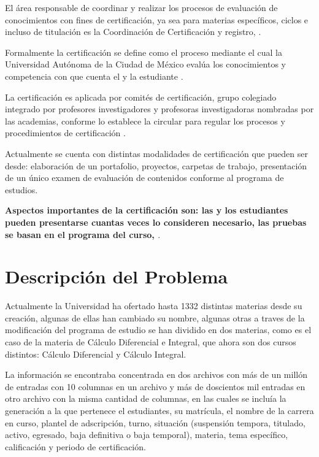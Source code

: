 \documentclass[12pt]{article}
\begin{document}
El \'area responsable de coordinar y realizar los procesos de evaluaci\'on de conocimientos con fines de certificaci\'on, ya sea para materias espec\'ificos, ciclos e incluso de titulaci\'on es la Coordinaci\'on de Certificaci\'on y registro, \cite{ProyectoEducativo}.

Formalmente la certificaci\'on se define como el proceso mediante el cual la Universidad Aut\'onoma de la Ciudad de M\'exico eval\'ua los conocimientos y competencia con que cuenta el y la estudiante \cite{CircularCertificacion}.

La certificaci\'on es aplicada por comit\'es de certificaci\'on, grupo colegiado integrado por profesores investigadores y profesoras investigadoras  nombradas por las academias,  conforme lo establece la circular para regular los procesos y procedimientos de certificaci\'on \cite{CircularCertificacion}.


Actualmente se cuenta con distintas modalidades de certificaci\'on que pueden ser desde: elaboraci\'on de un portafolio,  proyectos, carpetas de trabajo,  presentaci\'on de un \'unico examen de evaluaci\'on de contenidos conforme al programa de estudios.

\textbf{Aspectos importantes de la certificaci\'on son: las y los estudiantes pueden presentarse cuantas veces lo consideren necesario, las pruebas se basan en el programa del curso, \cite{Doc3}}.



\section{Descripci\'on del Problema}

Actualmente la Universidad ha ofertado hasta 1332 distintas materias desde su creaci\'on, algunas de ellas han cambiado su nombre, algunas otras a traves de la modificaci\'on del programa de estudio se han dividido en dos materias, como es el caso de la materia de C\'alculo Diferencial e Integral, que ahora son dos cursos distintos: C\'alculo Diferencial y C\'alculo Integral.

La informaci\'on se encontraba concentrada en dos archivos con m\'as de un mill\'on de entradas con 10 columnas en un archivo y m\'as de doscientos mil entradas en otro archivo con la misma cantidad de columnas, en las cuales se inclu\'ia la generaci\'on a la que pertenece el estudiantes, su matr\'icula, el nombre de la carrera en curso,  plantel de adscripci\'on, turno, situaci\'on (suspensi\'on tempora, titulado,   activo,  egresado,  baja definitiva o baja temporal), materia, tema espec\'ifico, calificaci\'on y periodo de certificaci\'on.
\end{document}
